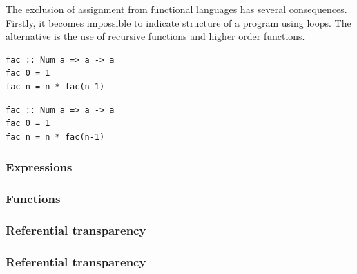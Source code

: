 The exclusion of assignment from functional languages has several consequences. Firstly, it becomes impossible to indicate structure of a program using loops. The alternative is the use of recursive functions and higher order functions. 
\begin{lstlisting}
fac :: Num a => a -> a
fac 0 = 1
fac n = n * fac(n-1)
\end{lstlisting}

\begin{lstlisting}
fac :: Num a => a -> a
fac 0 = 1
fac n = n * fac(n-1)
\end{lstlisting}


\subsubsection{Expressions}
\subsubsection{Functions}
\subsubsection{Referential transparency}
\subsubsection{Referential transparency}

\cite{FPIntro}
